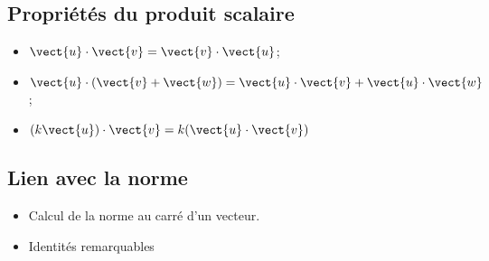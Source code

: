 \documentclass{article}
\begin{document}
\subsection{Propriétés du produit scalaire}
\begin{itemize}
\item $\vect{u}\cdot\vect{v} = \vect{v} \cdot \vect{u}$;
\item $\vect{u} \cdot (\vect{v} + \vect{w}) = \vect{u} \cdot \vect{v} + \vect{u} \cdot \vect{w}$;
\item $(k \vect{u}) \cdot \vect{v} = k (\vect{u} \cdot \vect{v})$
\end{itemize}
\subsection{Lien avec la norme}
\begin{itemize}
\item Calcul de la norme au carré d'un vecteur.
\item Identités remarquables
\end{itemize}
\end{document}
